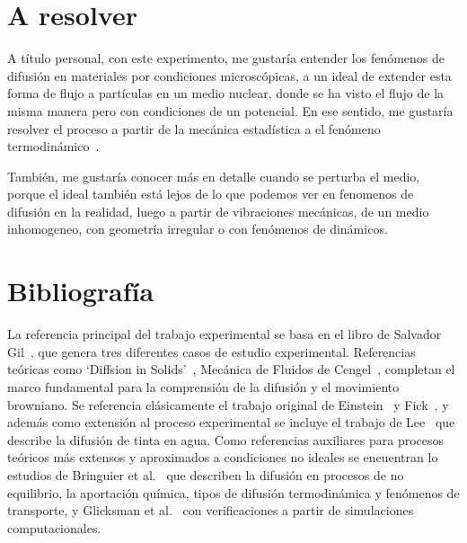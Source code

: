 \documentclass{article}[13pt]
\begin{document}
\section*{A resolver}
A título personal, con este experimento, me gustaría entender los fenómenos de difusión en materiales por condiciones microscópicas, a un ideal de extender esta forma de flujo a partículas en un medio nuclear, donde se ha visto el flujo de la misma manera pero con condiciones de un potencial. En ese sentido, me gustaría resolver el proceso a partir de la mecánica estadística a el fenómeno termodinámico~\cite{reif2009fundamentals}.

También, me gustaría conocer más en detalle cuando se perturba el medio, porque el ideal también está lejos de lo que podemos ver en fenomenos de difusión en la realidad, luego a partir de vibraciones mecánicas, de un medio inhomogeneo, con geometría irregular o con fenómenos de dinámicos.

\section*{Bibliografía}
La referencia principal del trabajo experimental se basa en el libro de Salvador Gil~\cite{gilExperimentosFisicaUsando2014}, que genera tres diferentes casos de estudio experimental. Referencias teóricas como `Diffsion in Solids'~\cite{mehrerHistoryBibliographyDiffusion2007}, Mecánica de Fluidos de Cengel~\cite{çengel2006mecánica}, completan el marco fundamental para la comprensión de la difusión y el movimiento browniano. Se referencia clásicamente el trabajo original de Einstein~\cite{einsteinUberMolekularkinetischenTheorie1905} y Fick~\cite{fickLiquidDiffusion1995}, y además como extensión al proceso experimental se incluye el trabajo de Lee~\cite{leeInkDifussionWater2004} que describe la difusión de tinta en agua. Como referencias auxiliares para procesos teóricos más extensos y aproximados a condiciones no ideales se encuentran lo estudios de Bringuier et al.~\cite{Bringuier_2009} que describen la difusión en procesos de no equilibrio, la aportación química, tipos de difusión termodinámica y fenómenos de transporte, y Glicksman et al.~\cite{didomizioSimulationFicksVerification2006} con verificaciones a partir de simulaciones computacionales.



\end{document}
